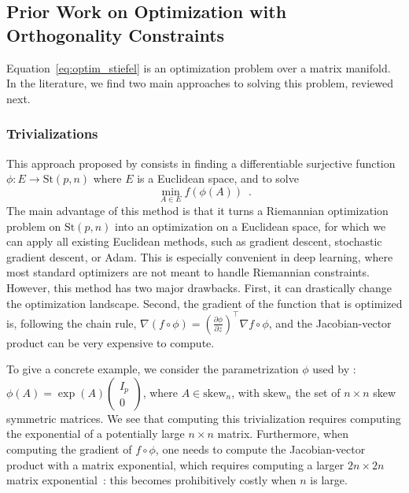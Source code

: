 \documentclass[twoside,11pt]{article}
\newcommand{\stiefel}{{\mathrm{St}(p, n)}}
\newcommand{\sk}{{\mathrm{skew}}}
\begin{document}
%

%

\subsection{Prior Work on Optimization with Orthogonality Constraints}

%
%
%
%
%
%
%
%

Equation~\eqref{eq:optim_stiefel}
is an optimization problem over a matrix manifold. In the literature, we find two main approaches to solving this problem, reviewed next.
%
\subsubsection{Trivializations} This approach proposed by \citet{lezcano2019cheap, lezcano2019trivializations} consists in finding a differentiable surjective function $\phi:E\to \stiefel$ where $E$ is a
%
Euclidean space, and to solve
\begin{equation}
  \label{eq:trivialization}
  \min_{A\in E}f(\phi(A))\enspace.
\end{equation}
%
The main advantage of this method is that it turns a Riemannian optimization problem on $\stiefel$ into an optimization on a Euclidean space,
for which we can apply all existing Euclidean methods, such as
gradient descent, stochastic gradient descent, or Adam. This is especially convenient in deep learning, where most standard optimizers are not meant to handle Riemannian constraints.
However, this method has two major drawbacks. First, it can drastically change the optimization landscape. Second, the gradient of the function that is optimized is, following the chain rule, $\nabla (f \circ \phi) = \left(\frac{\partial \phi}{\partial z}\right)^\top\nabla f \circ \phi$, and the Jacobian-vector product can be very expensive to compute.

To give a concrete example, we consider the parametrization $\phi$ used by \citet{singla2021skew}: $\phi(A) = \exp(A)\begin{pmatrix}
  I_p \\ 0
\end{pmatrix}$, where $A\in\sk_n$, with $\sk_n$ the set of $n\times n$ skew symmetric matrices. We see that computing this trivialization requires computing the exponential of a potentially large $n\times n$ matrix. Furthermore, when computing the gradient of $f\circ \phi$, one needs to compute the Jacobian-vector product with a matrix exponential, which requires computing a larger $2n \times 2n$ matrix exponential~\citep{lezcano2019cheap}: this becomes prohibitively costly when $n$ is large.
\end{document}
